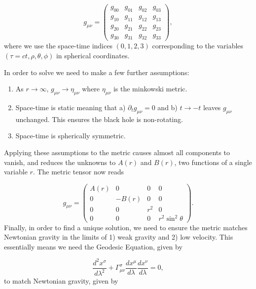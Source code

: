\documentclass{CUP-JNL-DTM}%
\theoremstyle{definition}
\numberwithin{equation}{section}
\begin{document}
\begin{equation}
    g_{\mu\nu} = \begin{pmatrix}
        g_{00} & g_{01} & g_{02} & g_{03} \\
        g_{10} & g_{11} & g_{12} & g_{13} \\
        g_{20} & g_{21} & g_{22} & g_{23} \\
        g_{30} & g_{31} & g_{32} & g_{33}
    \end{pmatrix},
\end{equation}
where we use the space-time indices $(0,1,2,3)$ corresponding to the variables $(\tau=ct, \rho, \theta, \phi)$ in spherical coordinates. 

In order to solve we need to make a few further assumptions:

\begin{enumerate}
    \item As $r \rightarrow \infty$, $g_{\mu\nu} \rightarrow \eta_{\mu\nu}$ where $\eta_{\mu\nu}$ is the minkowski metric. 
    \item Space-time is static meaning that a) $\partial_t g_{\mu\nu} = 0$ and b) $t \rightarrow -t$ leaves $g_{\mu\nu}$ unchanged. This ensures the black hole is non-rotating. 
    \item Space-time is spherically symmetric. 
\end{enumerate}
Applying these assumptions to the metric causes almost all components to vanish, and reduces the unknowns to $A(r)$ and $B(r)$, two functions of a single variable $r$. The metric tensor now reads 

\begin{equation}
    g_{\mu\nu} = \begin{pmatrix}
        A(r) & 0 & 0 & 0 \\
        0 & -B(r) & 0 & 0 \\
        0 & 0 & r^2 & 0 \\
        0 & 0 & 0 & r^2\sin^2\theta
    \end{pmatrix}.
    \label{eqn:g_simple}
\end{equation}
Finally, in order to find a unique solution, we need to ensure the metric matches Newtonian gravity in the limits of 1) weak gravity and 2) low velocity. This essentially means we need the Geodesic Equation, given by 

\begin{equation}
    \frac{d^2 x^{\sigma}}{d\lambda^2} + \Gamma^{\sigma}_{\mu\nu} \frac{dx^{\mu}}{d\lambda}\frac{dx^{\nu}}{d\lambda} = 0,
    \label{eqn:geo}
\end{equation}
to match Newtonian gravity, given by 
\end{document}
